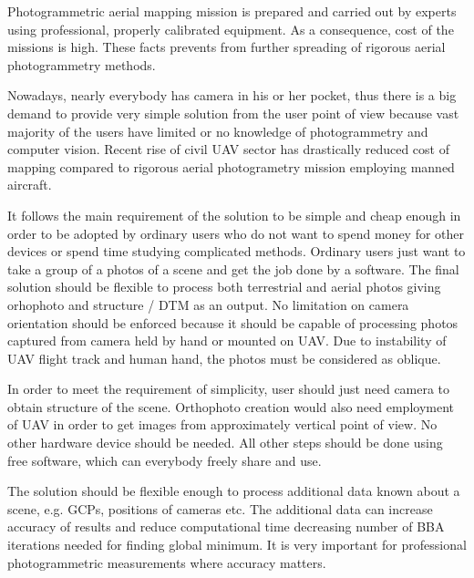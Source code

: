 \documentclass[a4paper,12pt]{article}
\begin{document}

Photogrammetric aerial mapping mission is prepared and carried out by experts using 
professional, properly calibrated equipment.
As a consequence, cost of the missions
is high. These facts prevents from further spreading of rigorous aerial photogrammetry methods.

Nowadays, nearly everybody has camera in his or her pocket, thus there is a big demand 
to provide very simple solution from the user point of view because 
vast majority of the users have limited or no knowledge of photogrammetry and computer vision. 
 Recent rise of civil UAV sector has drastically reduced cost of mapping   
  compared to rigorous aerial photogrametry mission employing manned aircraft.


It follows the main requirement 
of the solution to be simple and cheap enough
in order to be adopted by
ordinary users who do not want 
to spend money for other devices or spend time studying complicated methods. 
Ordinary users just 
want to take a group of a photos of a scene and get the job done by a software.
The final solution should be flexible to process both terrestrial and aerial photos
giving orhophoto and structure / DTM as an output. 
No limitation on camera orientation should be enforced because it should be capable 
of processing photos captured from camera held by hand or mounted on UAV.
Due to instability of UAV flight track and human hand, the photos 
must be considered as oblique. 


In order to meet the requirement of simplicity, user should just need  
 camera to obtain structure of the scene. Orthophoto creation would also need employment of UAV
in order to get images from approximately vertical point of view.
No other hardware device should be needed. 
All other steps should be done 
using free software, which can everybody freely share and use. 


The solution should be flexible enough to process additional data known about a scene, 
e.g. GCPs, positions of cameras etc. The additional data can
 increase accuracy of results and reduce computational time  
 decreasing number of  BBA iterations needed for finding global minimum. It is very important 
 for professional photogrammetric measurements where accuracy matters.
\end{document}
